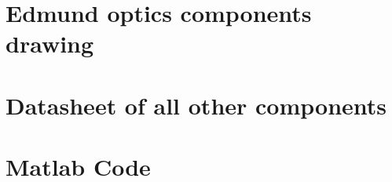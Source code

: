 \chapter{Edmund optics components drawing} \label{App:Edmund_MEP}

\newpage

\newpage

\newpage

\newpage

\newpage

\chapter{Datasheet of all other components}

\newpage

\chapter{Matlab Code} \label{App:Matlab}

\newpage

\newpage